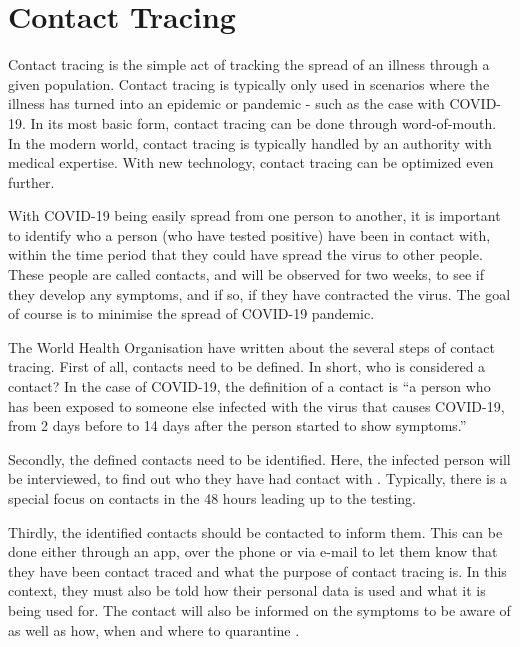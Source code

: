 \section{Contact Tracing}\label{Contact Tracing}

Contact tracing is the simple act of tracking the spread of an illness through a given population. Contact tracing is typically only used in scenarios where the illness has turned into an epidemic or pandemic - such as the case with COVID-19. In its most basic form, contact tracing can be done through word-of-mouth. In the modern world, contact tracing is typically handled by an authority with medical expertise. With new technology, contact tracing can be optimized even further.

With COVID-19 being easily spread from one person to another, it is important to identify who a person (who have tested positive) have been in contact with, within the time period that they could have spread the virus to other people. These people are called contacts, and will be observed for two weeks, to see if they develop any symptoms, and if so, if they have contracted the virus. The goal of course is to minimise the spread of COVID-19 pandemic\citep{who_headquarters_coronavirus_2020}.

The World Health Organisation have written about the several steps of contact tracing. First of all, contacts need to be defined. In short, who is considered a contact? In the case of COVID-19, the definition of a contact is ``a person who has been exposed to someone else infected with the virus that causes COVID-19, from 2 days before to 14 days after the person started to show symptoms.'' \citep{who_headquarters_coronavirus_2020}

Secondly, the defined contacts need to be identified. Here, the infected person will be interviewed,
to find out who they have had contact with \citep{who_headquarters_coronavirus_2020}. Typically, there is a special focus on contacts in the 48 hours leading up to the testing.

Thirdly, the identified contacts should be contacted to inform them. This can be done either through an app, over the phone or via e-mail to let them know that they have been contact traced and what the purpose of contact tracing is. In this context, they must also be told how their personal data is used and what it is being used for. The contact will also be informed on the symptoms to be aware of as well as how, when and where to quarantine \citep{who_headquarters_coronavirus_2020}.

